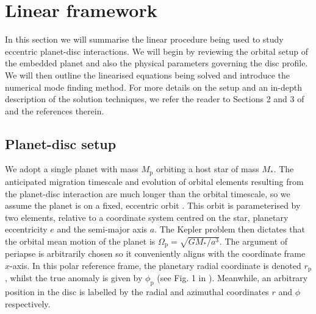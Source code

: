 \section{Linear framework}
\label{sec:linear_method}

In this section we will summarise the linear procedure being used to study eccentric planet-disc interactions. We will begin by reviewing the orbital setup of the embedded planet and also the physical parameters governing the disc profile. We will then outline the linearised equations being solved and introduce the numerical mode finding method. For more details on the setup and an in-depth description of the solution techniques, we refer the reader to Sections 2 and 3 of  and the references therein.

\subsection{Planet-disc setup}
\label{subsection:planet_disc_setup}

We adopt a single planet with mass $M_\textrm{p}$ orbiting a host star of mass $M_{*}$. The anticipated migration timescale and evolution of orbital elements resulting from the planet-disc interaction are much longer than the orbital timescale, so we assume the planet is on a fixed, eccentric orbit \citep[as per][]{GoldreichTremaine_1980}. This orbit is parameterised by two elements, relative to a coordinate system centred on the star, planetary eccentricity $e$ and the semi-major axis $a$. The Kepler problem then dictates that the orbital mean motion of the planet is $\Omega_\textrm{p} = \sqrt{G M_{*}/a^3}$. The argument of periapse is arbitrarily chosen so it conveniently aligns with the coordinate frame $x$-axis. In this polar reference frame, the planetary radial coordinate is denoted $r_\textrm{p}$, whilst the true anomaly is given by $\phi_\textrm{p}$ (see Fig. 1 in ). Meanwhile, an arbitrary position in the disc is labelled by the radial and azimuthal coordinates $r$ and $\phi$ respectively. 

